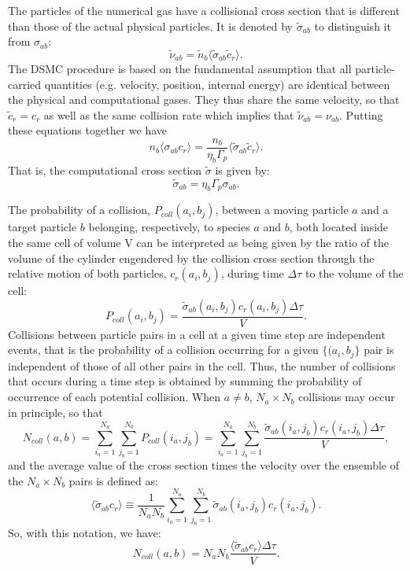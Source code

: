 \documentclass[12pt]{article}
\begin{document}
The particles of the numerical gas have a collisional cross section
that is different than those of the actual physical particles. It is
denoted by ${\tilde\sigma}_{ab}$ to distinguish it from $\sigma_{ab}$:
\begin{equation}
  \tilde{\nu}_{ab} = \tilde{n}_b \langle{\tilde{\sigma}_{ab} \tilde{c}_r}\rangle.
\end{equation}
The DSMC procedure is based on the fundamental assumption that all
particle-carried quantities (e.g. velocity, position, internal energy)
are identical between the physical and computational gases. They thus
share the same velocity, so that ${\tilde c}_r = c_r$ as well as the
same collision rate which implies that $\tilde{\nu}_{ab} =
\nu_{ab}$. Putting these equations together we have
\begin{equation}
  n_b \langle{\sigma_{ab} c_r}\rangle =
  \frac{n_b}{\eta_b\Gamma_p}\langle{\tilde{\sigma}_{ab} \tilde{c}_r}\rangle.
  \label{eq:balance}
\end{equation}
That is, the computational cross
section ${\tilde\sigma}$ is given by: 
\begin{equation}
{\tilde\sigma}_{ab} = \eta_b\Gamma_p \sigma_{ab}.
\end{equation}

The probability of a collision, $P_{coll}(a_i, b_j)$, between a moving
particle $a$ and a target particle $b$ belonging, respectively, to
species $a$ and $b$, both located inside the same cell of volume V can
be interpreted as being given by the ratio of the volume of the
cylinder engendered by the collision cross section through the
relative motion of both particles, $c_r(a_i, b_j)$, during time
$\Delta\tau$ to the volume of the cell:
\begin{equation}
  P_{coll}(a_i, b_j) = \frac{{\tilde\sigma}_{ab}(a_i, b_j)c_r(a_i, b_j)\Delta\tau}{V}.
\end{equation}
Collisions between particle pairs in a cell at a given time step are
independent events, that is the probability of a collision occurring
for a given $\{(a_i, b_j\}$ pair is independent of those of all other
pairs in the cell. Thus, the number of collisions that occurs during a
time step is obtained by summing the probability of occurrence of each
potential collision. When $a\not=b$, $N_a\times N_b$ collisions may
occur in principle, so that
\begin{equation}
N_{coll}(a, b) = \sum_{i_a=1}^{N_a}\sum_{j_b=1}^{N_b} P_{coll}(i_a, j_b) =
\sum_{i_a=1}^{N_a}\sum_{j_b=1}^{N_b}\frac{\tilde{\sigma}_{ab}(i_a, j_b)
  c_r(i_a, j_b)\Delta\tau}{V},
\end{equation}
and the average value of the cross section times the velocity over the
ensemble of the $N_a\times N_b$ pairs is defined as:
\begin{equation}
  \langle{\tilde{\sigma}_{ab} c_r}\rangle\equiv
  \frac{1}{N_a N_b} \sum_{i_a=1}^{N_a}\sum_{j_b=1}^{N_b} \tilde{\sigma}_{ab}(i_a, j_b)
  c_r(i_a, j_b).
\end{equation}
So, with this notation, we have:
\begin{equation}
N_{coll}(a, b) = N_a N_b \frac{\langle{\tilde{\sigma}_{ab} c_r}\rangle \Delta\tau}{V}.
\end{equation}
\end{document}
